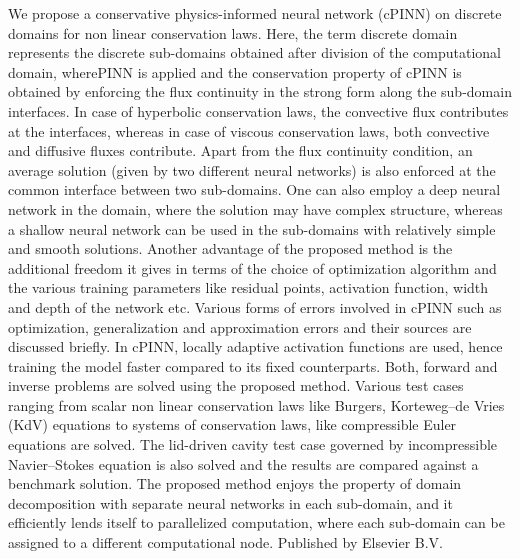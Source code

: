 We propose a conservative physics-informed neural network (cPINN) on discrete domains for non linear conservation laws. Here, the term discrete domain represents the discrete sub-domains obtained after division of the computational domain, wherePINN is applied and the conservation property of cPINN is obtained by enforcing the flux continuity in the strong form along the sub-domain interfaces. In case of hyperbolic conservation laws, the convective flux contributes at the interfaces, whereas in case of viscous conservation laws, both convective and diffusive fluxes contribute. Apart from the flux continuity condition, an average solution (given by two different neural networks) is also enforced at the common interface between two sub-domains. One can also employ a deep neural network in the domain, where the solution may have complex structure, whereas a shallow neural network can be used in the sub-domains with relatively simple and smooth solutions. Another advantage of the proposed method is the additional freedom it gives in terms of the choice of optimization algorithm and the various training parameters like residual points, activation function, width and depth of the network etc. Various forms of errors involved in cPINN such as optimization, generalization and approximation errors and their sources are discussed briefly. In cPINN, locally adaptive activation functions are used, hence training the model faster compared to its fixed counterparts. Both, forward and inverse problems are solved using the proposed method. Various test cases ranging from scalar non linear conservation laws like Burgers, Korteweg–de Vries (KdV) equations to systems of conservation laws, like compressible Euler equations are solved. The lid-driven cavity test case governed by incompressible Navier–Stokes equation is also solved and the results are compared against a benchmark solution. The proposed method enjoys the property of domain decomposition with separate neural networks in each sub-domain, and it efficiently lends itself to parallelized computation, where each sub-domain can be assigned to a different computational node. Published by Elsevier B.V.



